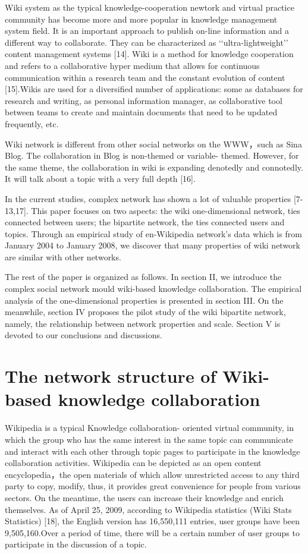 \documentclass{elsarticle}
\begin{document}
Wiki system as the typical knowledge-cooperation newtork and virtual practice community has become more and more popular in knowledge management system field. It is an important approach to publish on-line information and a different way to collaborate. They can be characterized as ‘‘ultra-lightweight’’ content management systems [14]. Wiki is a method for knowledge cooperation and refers to a collaborative hyper medium that allows for continuous communication within a research team and the constant evolution of content [15].Wikis are used for a diversified number of applications: some as databases for research and writing, as personal information manager, as collaborative tool between teams to create and maintain documents that need to be updated frequently, etc.

Wiki network is different from other social networks on the WWW，such as Sina Blog. The collaboration in Blog is non-themed or variable- themed. However, for the same theme, the collaboration in wiki is expanding denotedly and connotedly. It will talk about a topic with a very full depth [16].

In the current studies, complex network has shown a lot of valuable properties [7-13,17]. This paper focuses on two aspects: the wiki one-dimensional network, ties connected between users; the bipartite network, the ties connected users and topics. Through an empirical study of en-Wikipedia network’s data which is from January 2004 to January 2008, we discover that many properties of wiki network are similar with other networks. 

The rest of the paper is organized as follows. In section II, we
introduce the complex social network mould wiki-based knowledge
collaboration. The empirical analysis of the one-dimensional
properties is presented in section III. On the meanwhile, section IV
proposes the pilot study of the wiki bipartite network, namely, the
relationship between network properties and scale. Section V is
devoted to our conclusions and discussions.

\section{The network structure of Wiki-based knowledge collaboration}
\label{sec:netw-struct-wiki}

Wikipedia is a typical Knowledge collaboration- oriented virtual community, in which the group who has the same interest in the same topic can communicate and interact with each other through topic pages to participate in the knowledge collaboration activities. Wikipedia can be depicted as an open content encyclopedia，the open materials of which allow unrestricted access to any third party to copy, modify, thus, it  provides great convenience for people from various sectors. On the meantime, the users can increase their knowledge and enrich themselves. As of April 25, 2009, according to Wikipedia statistics (Wiki Stats Statistics) [18], the English version has 16,550,111 entries, user groups have been 9,505,160.Over a period of time, there will be a certain number of user groups to participate in the discussion of a topic.
\end{document}

